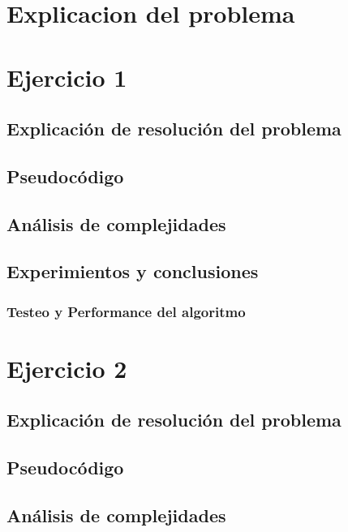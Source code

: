\documentclass[12pt, a4paper]{article}
\begin{document}
\maketitle
\tableofcontents
\newpage

\newpage
\section{Explicacion del problema}

\newpage
\section{Ejercicio 1} 
\subsection{Explicaci\'on de resoluci\'on del problema}

\subsection{Pseudoc\'odigo}

\subsection{An\'alisis de complejidades}

\subsection{Experimientos y conclusiones}
\subsubsection[1.5]{Testeo y Performance del algoritmo}



\newpage
\section{Ejercicio 2} 
\subsection{Explicaci\'on de resoluci\'on del problema}

\subsection{Pseudoc\'odigo}

\subsection{An\'alisis de complejidades}

\end{document}
